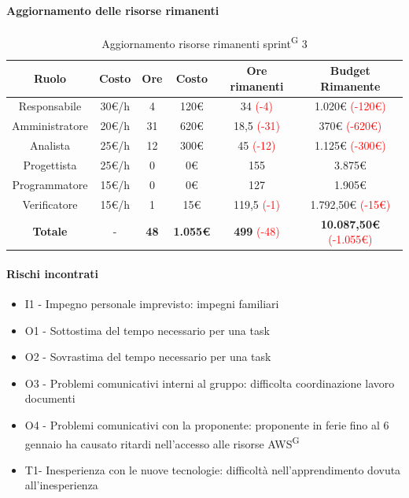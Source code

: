 \documentclass[a4paper, 11pt]{article}
\newcommand{\subsubsubsection}[1]{\paragraph{#1}}
\renewcommand{\arraystretch}{1.4} %
\begin{document}
\subsubsubsection{Aggiornamento delle risorse rimanenti}
\begin{table}[H]
    \centering
    \renewcommand{\arraystretch}{1.5}
    
    \begin{tabular}{|c|c|c|c|c|c|}
        \hline
        \textcolor{AccentColor}{\textbf{Ruolo}} &
        \textcolor{AccentColor}{\textbf{Costo}} &
        \textcolor{AccentColor}{\textbf{Ore}} &
        \textcolor{AccentColor}{\textbf{Costo}} &
        \textcolor{AccentColor}{\textbf{Ore rimanenti}} &
        \textcolor{AccentColor}{\textbf{Budget Rimanente}} \\ \hline
        
        Responsabile & 30€/h & 4 & 120€ & 34 \textcolor{red}{(-4)} & 1.020€ \textcolor{red}{(-120€)}\\ \hline
        
        Amministratore & 20€/h & 31 & 620€ & 18,5 \textcolor{red}{(-31)} & 370€ \textcolor{red}{(-620€)} \\ \hline
        
        Analista & 25€/h & 12 & 300€ & 45 \textcolor{red}{(-12)} & 1.125€ \textcolor{red}{(-300€)}\\ \hline
        
        Progettista & 25€/h & 0 & 0€ & 155 & 3.875€ \\ \hline
        
        Programmatore & 15€/h & 0 & 0€ & 127 & 1.905€ \\ \hline
        
        Verificatore & 15€/h & 1 & 15€ & 119,5 \textcolor{red}{(-1)}& 1.792,50€ \textcolor{red}{(-15€)} \\ \hline
        
        \textbf{Totale} & - & \textbf{48} & \textbf{1.055€} & \textbf{499} \textcolor{red}{(-48)} & \textbf{10.087,50€} \textcolor{red}{(-1.055€)}\\ \hline
    \end{tabular}
    \caption{Aggiornamento risorse rimanenti sprint\textsuperscript{G} 3}
\end{table}
\subsubsubsection{Rischi incontrati}
\begin{itemize}
  \item I1 - Impegno personale imprevisto: impegni familiari
  \item O1 - Sottostima del tempo necessario per una task
  \item O2 - Sovrastima del tempo necessario per una task
  \item O3 - Problemi comunicativi interni al gruppo: difficolta coordinazione lavoro documenti
  \item O4 - Problemi comunicativi con la proponente: proponente in ferie fino al 6 gennaio ha causato ritardi nell'accesso alle risorse AWS\textsuperscript{G}
  \item T1- Inesperienza con le nuove tecnologie: difficoltà nell'apprendimento dovuta all'inesperienza
\end{itemize}
\end{document}

